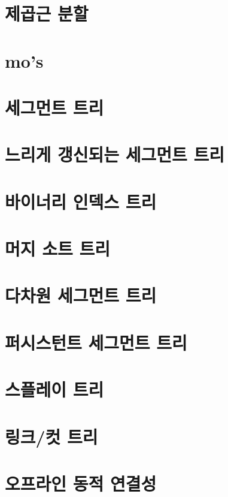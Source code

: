 \chapter{제곱근 분할}


\chapter{mo's}


\chapter{세그먼트 트리}


\chapter{느리게 갱신되는 세그먼트 트리}


\chapter{바이너리 인덱스 트리}


\chapter{머지 소트 트리}


\chapter{다차원 세그먼트 트리}


\chapter{퍼시스턴트 세그먼트 트리}


\chapter{스플레이 트리}


\chapter{링크/컷 트리}


\chapter{오프라인 동적 연결성}

